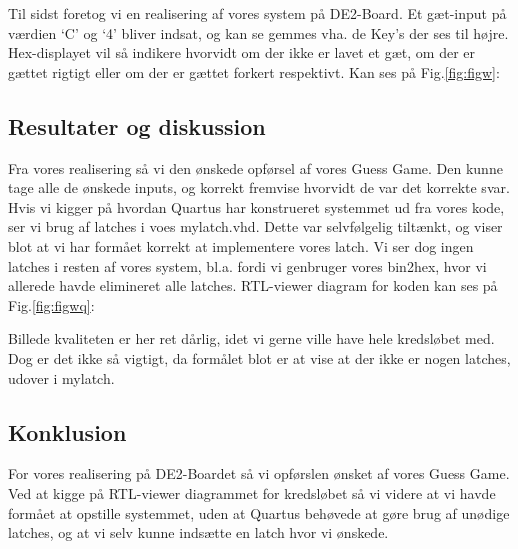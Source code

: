 \documentclass[../journal.tex]{subfiles}
\begin{document}
Til sidst foretog vi en realisering af vores system på DE2-Board. Et gæt-input på værdien `C' og `4' bliver indsat, og kan se gemmes vha. de Key's der ses til højre. Hex-displayet vil så indikere hvorvidt om der ikke er lavet et gæt, om der er gættet rigtigt eller om der er gættet forkert respektivt. Kan ses på Fig.\ref{fig:figw}:



\subsection{Resultater og diskussion}

Fra vores realisering så vi den ønskede opførsel af vores Guess Game. Den kunne tage alle de ønskede inputs, og korrekt fremvise hvorvidt de var det korrekte svar.\newline \newline
Hvis vi kigger på hvordan Quartus har konstrueret systemmet ud fra vores kode, ser vi brug af latches i voes mylatch.vhd. Dette var selvfølgelig tiltænkt, og viser blot at vi har formået korrekt at implementere vores latch. Vi ser dog ingen latches i resten af vores system, bl.a. fordi vi genbruger vores bin2hex, hvor vi allerede havde elimineret alle latches. RTL-viewer diagram for koden kan ses på Fig.\ref{fig:figwq}:


Billede kvaliteten er her ret dårlig, idet vi gerne ville have hele kredsløbet med. Dog er det ikke så vigtigt, da formålet blot er at vise at der ikke er nogen latches, udover i mylatch.


\subsection{Konklusion}
For vores realisering på DE2-Boardet så vi opførslen ønsket af vores Guess Game. Ved at kigge på RTL-viewer diagrammet for kredsløbet så vi videre at vi havde formået at opstille systemmet, uden at Quartus behøvede at gøre brug af unødige latches, og at vi selv kunne indsætte en latch hvor vi ønskede.
\end{document}
